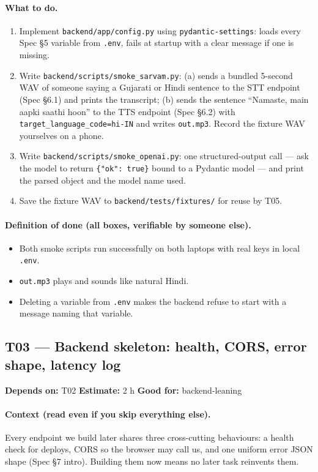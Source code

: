 \documentclass[11pt]{article}
\newcommand{\code}[1]{\texttt{#1}}
\newcommand{\taskmeta}[3]{\noindent\textbf{Depends on:} #1 \quad\textbullet\quad \textbf{Estimate:} #2 \quad\textbullet\quad \textbf{Good for:} #3\par\vspace{2pt}}
\newcommand{\ctx}[1]{\paragraph{Context (read even if you skip everything else).} #1}
\newcommand{\dod}{\paragraph{Definition of done (all boxes, verifiable by someone else).}}
\begin{document}
\paragraph{What to do.}
\begin{enumerate}
  \item Implement \code{backend/app/config.py} using \code{pydantic-settings}: loads every Spec \S5 variable from \code{.env}, fails at startup with a clear message if one is missing.
  \item Write \code{backend/scripts/smoke\_sarvam.py}: (a) sends a bundled 5-second WAV of someone saying a Gujarati or Hindi sentence to the STT endpoint (Spec \S6.1) and prints the transcript; (b) sends the sentence ``Namaste, main aapki saathi hoon'' to the TTS endpoint (Spec \S6.2) with \code{target\_language\_code=hi-IN} and writes \code{out.mp3}. Record the fixture WAV yourselves on a phone.
  \item Write \code{backend/scripts/smoke\_openai.py}: one structured-output call --- ask the model to return \code{\{"ok": true\}} bound to a Pydantic model --- and print the parsed object and the model name used.
  \item Save the fixture WAV to \code{backend/tests/fixtures/} for reuse by T05.
\end{enumerate}
\dod
\begin{itemize}
  \item Both smoke scripts run successfully on both laptops with real keys in local \code{.env}.
  \item \code{out.mp3} plays and sounds like natural Hindi.
  \item Deleting a variable from \code{.env} makes the backend refuse to start with a message naming that variable.
\end{itemize}

\subsection{T03 --- Backend skeleton: health, CORS, error shape, latency log \dag}
\taskmeta{T02}{2 h}{backend-leaning}
\ctx{Every endpoint we build later shares three cross-cutting behaviours: a health check for deploys, CORS so the browser may call us, and one uniform error JSON shape (Spec \S7 intro). Building them now means no later task reinvents them.}
\end{document}
